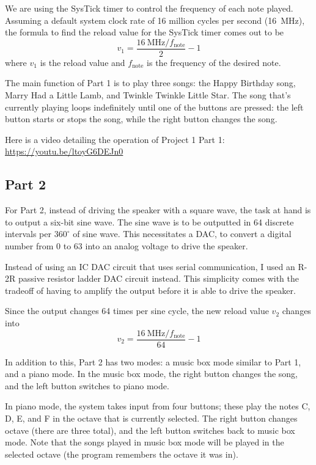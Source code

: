 \documentclass{article}
\begin{document}
We are using the SysTick timer to control the frequency of each
note played. Assuming a default system clock rate of 16 million
cycles per second (\SI{16}{\mega\hertz}), the formula to find
the reload value for the SysTick timer comes out to be
\begin{equation}\label{eq:reload part 1}
	v_1 = \frac{\SI{16}{\mega\hertz}/f_\text{note}}{2}-1
\end{equation} where \(v_1\) is the reload value and
\(f_\text{note}\) is the frequency of the desired note.

The main function of Part 1 is to play three songs: the Happy
Birthday song, Marry Had a Little Lamb, and Twinkle Twinkle
Little Star. The song that's currently playing loops indefinitely
until one of the buttons are pressed: the left button starts or
stops the song, while the right button changes the song.

Here is a video detailing the operation of Project 1 Part 1:
\url{https://youtu.be/ltoyG6DEJn0}

\subsection{Part 2}
For Part 2, instead of driving the speaker with a square wave,
the task at hand is to output a six-bit sine wave. The sine
wave is to be outputted in 64 discrete intervals per
\(360^\circ\) of sine wave. This necessitates a DAC, to convert
a digital number from 0 to 63 into an analog voltage to drive
the speaker.

Instead of using an IC DAC circuit that uses serial
communication, I used an R-2R passive resistor ladder DAC circuit
instead. This simplicity comes with the tradeoff of having to
amplify the output before it is able to drive the speaker.

Since the output changes 64 times per sine cycle, the new
reload value \(v_2\) changes into
\begin{equation}\label{eq:reload part 2}
	v_2 = \frac{\SI{16}{\mega\hertz}/f_\text{note}}{64}-1
\end{equation}

In addition to this, Part 2 has two modes: a music box mode
similar to Part 1, and a piano mode. In the music box mode,
the right button changes the song, and the left button switches
to piano mode.

In piano mode, the system takes input from four buttons; these
play the notes C, D, E, and F in the octave that is currently
selected. The right button changes octave (there are three total),
and the left button switches back to music box mode. Note that
the songs played in music box mode will be played in the
selected octave (the program remembers the octave it was in).
\end{document}
